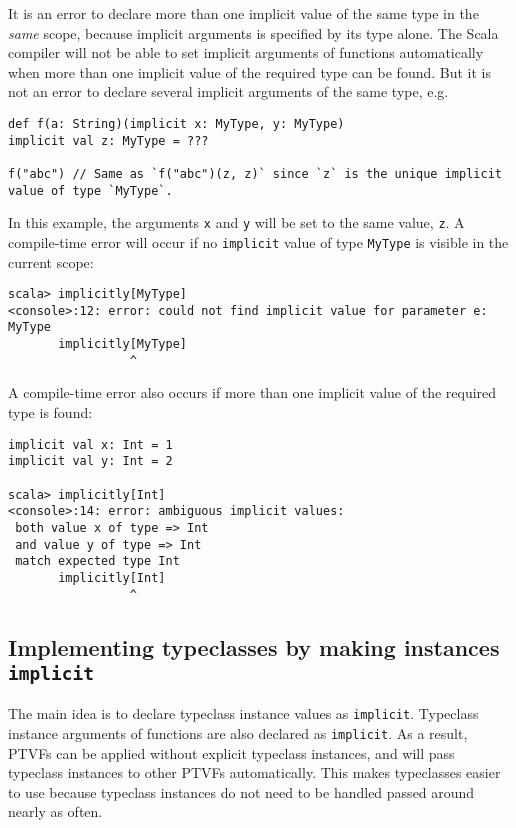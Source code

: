 It is an error to declare more than one implicit value of the same
type in the \emph{same} scope, because implicit arguments is specified
by its type alone. The Scala compiler will not be able to set implicit
arguments of functions automatically when more than one implicit value
of the required type can be found. But it is not an error to declare
several implicit arguments of the same type, e.g.~
\begin{lstlisting}
def f(a: String)(implicit x: MyType, y: MyType)
implicit val z: MyType = ???

f("abc") // Same as `f("abc")(z, z)` since `z` is the unique implicit value of type `MyType`.
\end{lstlisting}
In this example, the arguments \lstinline!x! and \lstinline!y! will
be set to the same value, \lstinline!z!. A compile-time error will
occur if no \lstinline!implicit! value of type \lstinline!MyType!
is visible in the current scope:
\begin{lstlisting}
scala> implicitly[MyType]
<console>:12: error: could not find implicit value for parameter e: MyType
       implicitly[MyType]
                 ^
\end{lstlisting}
A compile-time error also occurs if more than one implicit value of
the required type is found:
\begin{lstlisting}
implicit val x: Int = 1
implicit val y: Int = 2

scala> implicitly[Int]
<console>:14: error: ambiguous implicit values:
 both value x of type => Int
 and value y of type => Int
 match expected type Int
       implicitly[Int]
                 ^
\end{lstlisting}


\subsection{Implementing typeclasses by making instances \texttt{implicit} }

The main idea is to declare typeclass instance values as \lstinline!implicit!.
Typeclass instance arguments of functions are also declared as \lstinline!implicit!.
As a result, PTVFs can be applied without explicit typeclass instances,
and will pass typeclass instances to other PTVFs automatically. This
makes typeclasses easier to use because typeclass instances do not
need to be handled passed around nearly as often.

